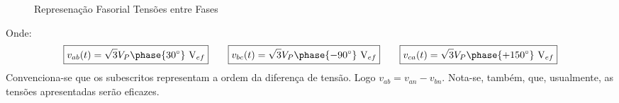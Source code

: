 \documentclass{article}
\begin{document}
\begin{definition}
\begin{figure}[H]
                        \caption{Represenação Fasorial Tensões entre Fases}
                    \end{figure}\noindent
                Onde:
                    \begin{equation}
                        \boxed{v_{ab}(t) = \sqrt{3}V_{P}\phase{  30^{\circ}}\text{ V}_{ef}}
                        \qquad
                        \boxed{v_{bc}(t) = \sqrt{3}V_{P}\phase{- 90^{\circ}}\text{ V}_{ef}}
                        \qquad
                        \boxed{v_{ca}(t) = \sqrt{3}V_{P}\phase{+150^{\circ}}\text{ V}_{ef}}
                    \end{equation}
                Convenciona-se que os subescritos representam a ordem da diferença de tensão. Logo $v_{ab} = v_{an} - v_{bn}$. Nota-se, também, que, usualmente, as tensões apresentadas serão eficazes.
            \end{definition}
\end{document}
